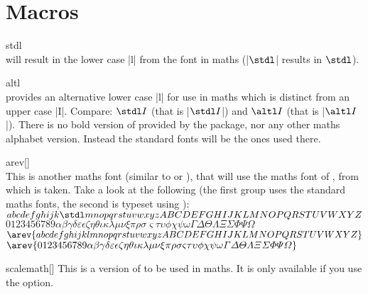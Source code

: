 \section{Macros}\label{sec:fonts:macros}
\begin{describemacro}{stdl}
  \\
   will result in the lower case |l| from the  font in
  maths (\bverb|$\stdl$| results in $\stdl$).
\end{describemacro}
\begin{describemacro}{altl}
  \\
   provides an alternative lower case |l| for use in maths which is
  distinct from an upper case |I|. Compare: $\stdl I$ (that is |$\stdl I$|) and
  $\altl I$ (that is |$\altl I$|). There is no bold version of 
  provided by the package, nor any other maths alphabet version. Instead the
  standard fonts will be the ones used there.
\end{describemacro}
\begin{describemacro}{arev}[]
  \\
  This is another maths font (similar to  or ), that will
  use the maths font of , from which  is taken. Take a
  look at the following (the first group uses the standard maths fonts, the
  second is typeset using ):\\[\parskip]
  $abcdefghijk\stdl mnopqrstuvwxyzABCDEFGHIJKLMNOPQRSTUVWXYZ$\\
  $
    0123456789
    \alpha\beta\gamma\delta\varepsilon\epsilon\zeta\eta\theta\iota\kappa\lambda
    \mu\nu\xi\pi\rho\sigma\varsigma\tau\upsilon\phi\chi\psi\omega
    \Gamma\Delta\Theta\Lambda\Xi\Sigma\Phi\Psi\Omega
  $\\[\parskip]
  $\arev{abcdefghijklmnopqrstuvwxyzABCDEFGHIJKLMNOPQRSTUVWXYZ}$\\
  $\arev{
    0123456789
    \alpha\beta\gamma\delta\varepsilon\epsilon\zeta\eta\theta\iota\kappa\lambda
    \mu\nu\xi\pi\rho\sigma\varsigma\tau\upsilon\phi\chi\psi\omega
    \Gamma\Delta\Theta\Lambda\Xi\Sigma\Phi\Psi\Omega
  }$
\end{describemacro}
\begin{describemacro}{scalemath}[]
  This is a version of  to be used in maths. It is only available
  if you use the  option.
\end{describemacro}

